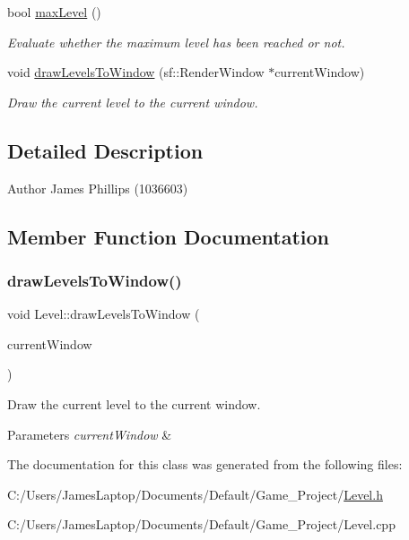 \begin{DoxyCompactItemize}
bool \hyperlink{class_level_a702a1a057a4572ea37b701126501621a}{max\+Level} ()
\begin{DoxyCompactList}\small\item\em Evaluate whether the maximum level has been reached or not. \end{DoxyCompactList}\item 
void \hyperlink{class_level_a4cdf43966bbd49ea4f392762c4cd7991}{draw\+Levels\+To\+Window} (sf\+::\+Render\+Window $\ast$current\+Window)
\begin{DoxyCompactList}\small\item\em Draw the current level to the current window. \end{DoxyCompactList}\end{DoxyCompactItemize}


\subsection{Detailed Description}
\begin{DoxyAuthor}{Author}
James Phillips (1036603) 
\end{DoxyAuthor}


\subsection{Member Function Documentation}
\mbox{\label{class_level_a4cdf43966bbd49ea4f392762c4cd7991}} 
\subsubsection{\texorpdfstring{draw\+Levels\+To\+Window()}{drawLevelsToWindow()}}
{\footnotesize\ttfamily void Level\+::draw\+Levels\+To\+Window (\begin{DoxyParamCaption}\item[{sf\+::\+Render\+Window $\ast$}]{current\+Window }\end{DoxyParamCaption})}



Draw the current level to the current window. 


\begin{DoxyParams}{Parameters}
{\em current\+Window} & \\
\hline
\end{DoxyParams}


The documentation for this class was generated from the following files\+:\begin{DoxyCompactItemize}
\item 
C\+:/\+Users/\+James\+Laptop/\+Documents/\+Default/\+Game\+\_\+\+Project/\hyperlink{_level_8h}{Level.\+h}\item 
C\+:/\+Users/\+James\+Laptop/\+Documents/\+Default/\+Game\+\_\+\+Project/Level.\+cpp\end{DoxyCompactItemize}
